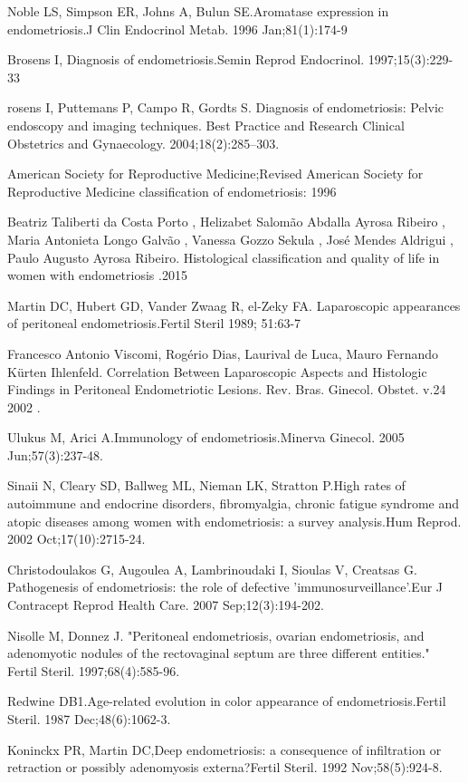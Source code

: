 \documentclass[12pt]{article} %
\begin{document}
Noble LS, Simpson ER, Johns A, Bulun SE.Aromatase expression in endometriosis.J Clin Endocrinol Metab. 1996 Jan;81(1):174-9

Brosens I, Diagnosis of endometriosis.Semin Reprod Endocrinol. 1997;15(3):229-33

rosens I, Puttemans P, Campo R, Gordts S. Diagnosis of endometriosis: Pelvic endoscopy and imaging techniques. Best Practice and Research Clinical Obstetrics and Gynaecology. 2004;18(2):285–303.

American Society for Reproductive Medicine;Revised American Society for Reproductive Medicine classification of endometriosis: 1996

Beatriz Taliberti da Costa Porto , Helizabet Salomão Abdalla Ayrosa Ribeiro , Maria Antonieta Longo Galvão , Vanessa Gozzo Sekula , José Mendes Aldrigui , Paulo Augusto Ayrosa Ribeiro.
Histological classification and quality of life in women with endometriosis .2015

Martin DC, Hubert GD, Vander Zwaag R, el-Zeky FA. Laparoscopic appearances of peritoneal endometriosis.Fertil Steril 1989; 51:63-7

Francesco Antonio Viscomi, Rogério Dias, Laurival de Luca, Mauro Fernando Kürten Ihlenfeld. Correlation Between Laparoscopic Aspects and Histologic Findings in Peritoneal Endometriotic Lesions. Rev. Bras. Ginecol. Obstet. v.24 2002 .

Ulukus M, Arici A.Immunology of endometriosis.Minerva Ginecol. 2005 Jun;57(3):237-48.

Sinaii N, Cleary SD, Ballweg ML, Nieman LK, Stratton P.High rates of autoimmune and endocrine disorders, fibromyalgia, chronic fatigue syndrome and atopic diseases among women with endometriosis: a survey analysis.Hum Reprod. 2002 Oct;17(10):2715-24.

Christodoulakos G, Augoulea A, Lambrinoudaki I, Sioulas V, Creatsas G. Pathogenesis of endometriosis: the role of defective 'immunosurveillance'.Eur J Contracept Reprod Health Care. 2007 Sep;12(3):194-202.

Nisolle M, Donnez J. "Peritoneal endometriosis, ovarian endometriosis, and
adenomyotic nodules of the rectovaginal septum are three different entities."
Fertil Steril. 1997;68(4):585-96.

Redwine DB1.Age-related evolution in color appearance of endometriosis.Fertil Steril. 1987 Dec;48(6):1062-3.

Koninckx PR, Martin DC,Deep endometriosis: a consequence of infiltration or retraction or possibly adenomyosis externa?Fertil Steril. 1992 Nov;58(5):924-8.
\end{document}

